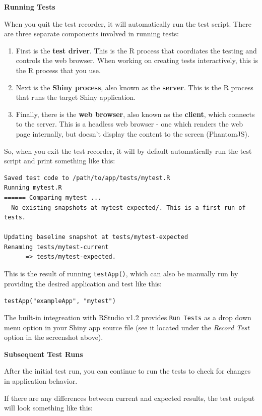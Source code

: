 \documentclass[]{book}
\providecommand{\tightlist}{%
  \setlength{\itemsep}{0pt}\setlength{\parskip}{0pt}}
\theoremstyle{definition}
\theoremstyle{definition}
\theoremstyle{definition}
\theoremstyle{remark}
\begin{document}
\textbf{Running Tests}

When you quit the test recorder, it will automatically run the test
script. There are three separate components involved in running tests:

\begin{enumerate}
\def\labelenumi{\arabic{enumi}.}
\tightlist
\item
  First is the \textbf{test driver}. This is the R process that
  coordiates the testing and controls the web browser. When working on
  creating tests interactively, this is the R process that you use.
\item
  Next is the \textbf{Shiny process}, also known as the \textbf{server}.
  This is the R process that runs the target Shiny application.
\item
  Finally, there is the \textbf{web browser}, also known as the
  \textbf{client}, which connects to the server. This is a headless web
  browser - one which renders the web page internally, but doesn't
  display the content to the screen (PhantomJS).
\end{enumerate}

So, when you exit the test recorder, it will by default automatically
run the test script and print something like this:

\begin{verbatim}
Saved test code to /path/to/app/tests/mytest.R
Running mytest.R 
====== Comparing mytest ...
  No existing snapshots at mytest-expected/. This is a first run of tests.

Updating baseline snapshot at tests/mytest-expected
Renaming tests/mytest-current
      => tests/mytest-expected.
\end{verbatim}

This is the result of running \texttt{testApp()}, which can also be
manually run by providing the desired application and test like this:

\texttt{testApp("exampleApp",\ "mytest")}

The built-in integreation with RStudio v1.2 provides \texttt{Run\ Tests}
as a drop down menu option in your Shiny app source file (see it located
under the \emph{Record Test} option in the screenshot above).

\textbf{Subsequent Test Runs}

After the initial test run, you can continue to run the tests to check
for changes in application behavior.

If there are any differences between current and expected results, the
test output will look something like this:
\end{document}
